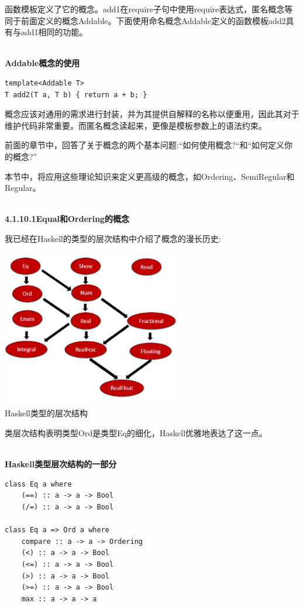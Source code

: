 函数模板定义了它的概念。add1在require子句中使用require表达式，匿名概念等同于前面定义的概念Addable。下面使用命名概念Addable定义的函数模板add2具有与add1相同的功能。

\hspace*{\fill} \\ %
\noindent
\textbf{Addable概念的使用}
\begin{lstlisting}[style=styleCXX]
template<Addable T>
T add2(T a, T b) { return a + b; }
\end{lstlisting}

概念应该对通用的需求进行封装，并为其提供自解释的名称以便重用，因此其对于维护代码非常重要。而匿名概念读起来，更像是模板参数上的语法约束。


前面的章节中，回答了关于概念的两个基本问题:“如何使用概念?“和“如何定义你的概念?”

本节中，将应用这些理论知识来定义更高级的概念，如Ordering、SemiRegular和Regular。

\hspace*{\fill} \\ %
\noindent
\textbf{4.1.10.1\hspace{0.2cm}Equal和Ordering的概念}

我已经在Haskell的类型的层次结构中介绍了概念的漫长历史:

\begin{center}
\includegraphics[width=0.6\textwidth]{content/3/chapter4/images/9.png}\\
Haskell类型的层次结构
\end{center}

类层次结构表明类型Ord是类型Eq的细化，Haskell优雅地表达了这一点。

\hspace*{\fill} \\ %
\noindent
\textbf{Haskell类型层次结构的一部分}
\begin{lstlisting}[style=styleCXX]
class Eq a where
	(==) :: a -> a -> Bool
	(/=) :: a -> a -> Bool

class Eq a => Ord a where
	compare :: a -> a -> Ordering
	(<) :: a -> a -> Bool
	(<=) :: a -> a -> Bool
	(>) :: a -> a -> Bool
	(>=) :: a -> a -> Bool
	max :: a -> a -> a
\end{lstlisting}

